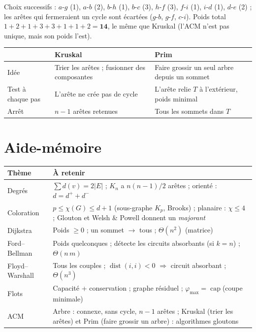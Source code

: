 \documentclass[11pt,a4paper]{article}
\renewcommand{\arraystretch}{1.3}
\newcommand{\dist}{\operatorname{dist}}
\begin{document}
\begin{exemple}
Choix successifs : $a$-$g$ (1), $a$-$b$ (2), $b$-$h$ (1), $b$-$c$ (3), $h$-$f$ (3), $f$-$i$ (1), $i$-$d$ (1), $d$-$e$ (2) ; les arêtes qui fermeraient un cycle sont écartées ($g$-$b$, $g$-$f$, $c$-$i$). Poids total $1+2+1+3+3+1+1+2=\mathbf{14}$, le même que Kruskal (l'ACM n'est pas unique, mais son poids l'est).
\end{exemple}

\begin{center}
\small
\begin{tabular}{@{}p{3cm}p{6.1cm}p{6.1cm}@{}}
\toprule
 & \textbf{Kruskal} & \textbf{Prim}\\
\midrule
Idée & Trier les arêtes ; fusionner des composantes & Faire grossir un seul arbre depuis un sommet\\
Test à chaque pas & L'arête ne crée pas de cycle & L'arête relie $T$ à l'extérieur, poids minimal\\
Arrêt & $n-1$ arêtes retenues & Tous les sommets dans $T$\\
\bottomrule
\end{tabular}
\end{center}

\section{Aide-mémoire}
\begin{center}
\small
\renewcommand{\arraystretch}{1.4}
\begin{tabular}{@{}p{3.8cm}p{11.8cm}@{}}
\toprule
\textbf{Thème} & \textbf{À retenir}\\
\midrule
Degrés & $\sum d(v)=2|E|$ ; $K_n$ a $n(n-1)/2$ arêtes ; orienté : $d=d^++d^-$\\
Coloration & $p\le\chi(G)\le d+1$ (sous-graphe $K_p$, Brooks) ; planaire : $\chi\le4$ ; Glouton et Welsh \& Powell donnent un \emph{majorant}\\
Dijkstra & Poids $\ge0$ ; un sommet $\to$ tous ; $\Theta(n^2)$ (matrice)\\
Ford--Bellman & Poids quelconques ; détecte les circuits absorbants (si $k=n$) ; $\Theta(n\,m)$\\
Floyd--Warshall & Tous les couples ; $\dist(i,i)<0$ $\Rightarrow$ circuit absorbant ; $\Theta(n^3)$\\
Flots & Capacité + conservation ; graphe résiduel ; $\varphi_{\max}=\operatorname{cap}$(coupe minimale)\\
ACM & Arbre : connexe, sans cycle, $n-1$ arêtes ; Kruskal (trier les arêtes) et Prim (faire grossir un arbre) : algorithmes gloutons\\
\bottomrule
\end{tabular}
\end{center}
\end{document}
